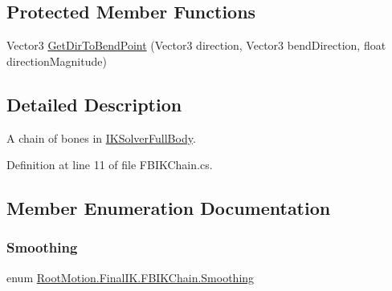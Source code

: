 \subsection*{Protected Member Functions}
\begin{DoxyCompactItemize}
\item 
Vector3 \mbox{\hyperlink{class_root_motion_1_1_final_i_k_1_1_f_b_i_k_chain_a2042f6c29dd84d524542db75c18967eb}{Get\+Dir\+To\+Bend\+Point}} (Vector3 direction, Vector3 bend\+Direction, float direction\+Magnitude)
\end{DoxyCompactItemize}


\subsection{Detailed Description}
A chain of bones in \mbox{\hyperlink{class_root_motion_1_1_final_i_k_1_1_i_k_solver_full_body}{I\+K\+Solver\+Full\+Body}}. 



Definition at line 11 of file F\+B\+I\+K\+Chain.\+cs.



\subsection{Member Enumeration Documentation}
\mbox{\label{class_root_motion_1_1_final_i_k_1_1_f_b_i_k_chain_a2c75de88180a5922368eaa4c4efb3ac9}} 
\subsubsection{\texorpdfstring{Smoothing}{Smoothing}}
{\footnotesize\ttfamily enum \mbox{\hyperlink{class_root_motion_1_1_final_i_k_1_1_f_b_i_k_chain_a2c75de88180a5922368eaa4c4efb3ac9}{Root\+Motion.\+Final\+I\+K.\+F\+B\+I\+K\+Chain.\+Smoothing}}\hspace{0.3cm}{\ttfamily [strong]}}

